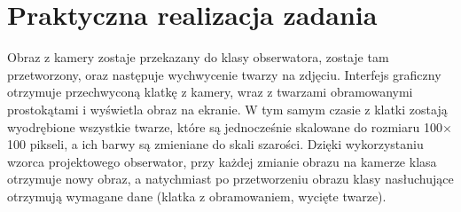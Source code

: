 \section{Praktyczna realizacja zadania}
Obraz z kamery zostaje przekazany do klasy obserwatora, zostaje tam przetworzony, oraz następuje wychwycenie twarzy na zdjęciu. Interfejs graficzny otrzymuje przechwyconą klatkę z kamery, wraz z twarzami obramowanymi prostokątami i wyświetla obraz na ekranie. W tym samym czasie z klatki zostają wyodrębione wszystkie twarze, które są jednocześnie skalowane do rozmiaru 100\begin{math}\times\end{math}100 pikseli, a ich barwy są zmieniane do skali szarości. Dzięki wykorzystaniu wzorca projektowego obserwator, przy każdej zmianie obrazu na kamerze klasa otrzymuje nowy obraz, a natychmiast po przetworzeniu obrazu klasy nasłuchujące otrzymują wymagane dane (klatka z obramowaniem, wycięte twarze).


\pagebreak[4]
